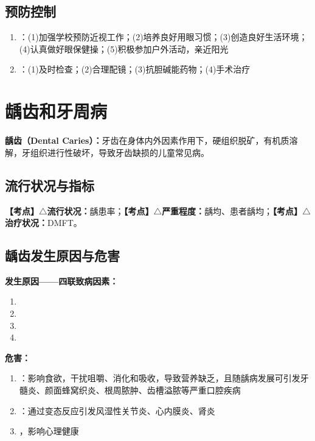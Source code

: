 \subsection{预防控制}

\begin{keybox}
\begin{enumerate}[leftmargin=*]
    \item {}：(1)加强学校预防近视工作；(2)培养良好用眼习惯；(3)创造良好生活环境；(4)认真做好眼保健操；(5)积极参加户外活动，亲近阳光
    \item {}：(1)及时检查；(2)合理配镜；(3)抗胆碱能药物；(4)手术治疗
\end{enumerate}
\end{keybox}

\section{龋齿和牙周病}

\begin{defbox}
\textbf{龋齿（Dental Caries）：}牙齿在身体内外因素作用下，硬组织脱矿，有机质溶解，牙组织进行性破坏，导致牙齿缺损的儿童常见病。
\end{defbox}

\subsection{流行状况与指标}

\begin{keybox}
\textbf{【考点】$\triangle$流行状况：}龋患率；\textbf{【考点】$\triangle$严重程度：}龋均、患者龋均；\textbf{【考点】$\triangle$治疗状况：}DMFT。
\end{keybox}

\subsection{龋齿发生原因与危害}

\begin{keybox}
\textbf{发生原因——四联致病因素：}
\begin{enumerate}[leftmargin=*]
    \item {}
    \item {}
    \item {}
    \item {}
\end{enumerate}

\textbf{危害：}
\begin{enumerate}[leftmargin=*]
    \item {}：影响食欲，干扰咀嚼、消化和吸收，导致营养缺乏，且随龋病发展可引发牙髓炎、颜面蜂窝织炎、根周脓肿、齿槽溢脓等严重口腔疾病
    \item {}：通过变态反应引发风湿性关节炎、心内膜炎、肾炎
    \item {}，影响心理健康
\end{enumerate}
\end{keybox}


